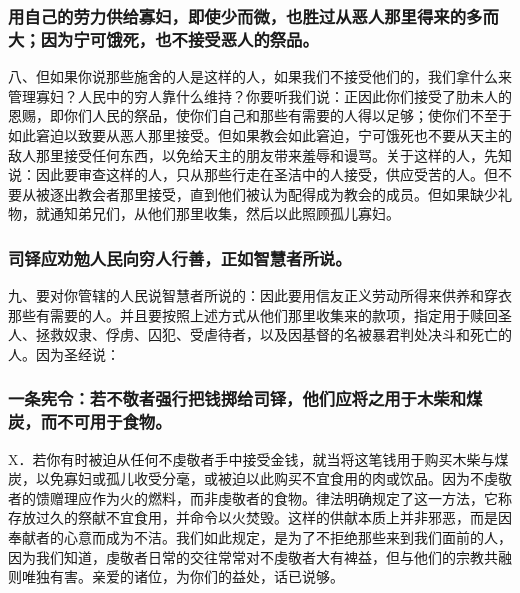 
\subsubsection{用自己的劳力供给寡妇，即使少而微，也胜过从恶人那里得来的多而大；因为宁可饿死，也不接受恶人的祭品。}

八、但如果你说那些施舍的人是这样的人，如果我们不接受他们的，我们拿什么来管理寡妇？人民中的穷人靠什么维持？你要听我们说：正因此你们接受了肋未人的恩赐，即你们人民的祭品，使你们自己和那些有需要的人得以足够；使你们不至于如此窘迫以致要从恶人那里接受。但如果教会如此窘迫，宁可饿死也不要从天主的敌人那里接受任何东西，以免给天主的朋友带来羞辱和谩骂。关于这样的人，先知说：因此要审查这样的人，只从那些行走在圣洁中的人接受，供应受苦的人。但不要从被逐出教会者那里接受，直到他们被认为配得成为教会的成员。但如果缺少礼物，就通知弟兄们，从他们那里收集，然后以此照顾孤儿寡妇。\par


\subsubsection{司铎应劝勉人民向穷人行善，正如智慧者所说。}

九、要对你管辖的人民说智慧者所说的：因此要用信友正义劳动所得来供养和穿衣那些有需要的人。并且要按照上述方式从他们那里收集来的款项，指定用于赎回圣人、拯救奴隶、俘虏、囚犯、受虐待者，以及因基督的名被暴君判处决斗和死亡的人。因为圣经说：\par


\subsubsection{一条宪令：若不敬者强行把钱掷给司铎，他们应将之用于木柴和煤炭，而不可用于食物。}

X．若你有时被迫从任何不虔敬者手中接受金钱，就当将这笔钱用于购买木柴与煤炭，以免寡妇或孤儿收受分毫，或被迫以此购买不宜食用的肉或饮品。因为不虔敬者的馈赠理应作为火的燃料，而非虔敬者的食物。律法明确规定了这一方法，它称存放过久的祭献不宜食用，并命令以火焚毁。这样的供献本质上并非邪恶，而是因奉献者的心意而成为不洁。我们如此规定，是为了不拒绝那些来到我们面前的人，因为我们知道，虔敬者日常的交往常常对不虔敬者大有裨益，但与他们的宗教共融则唯独有害。亲爱的诸位，为你们的益处，话已说够。\par

